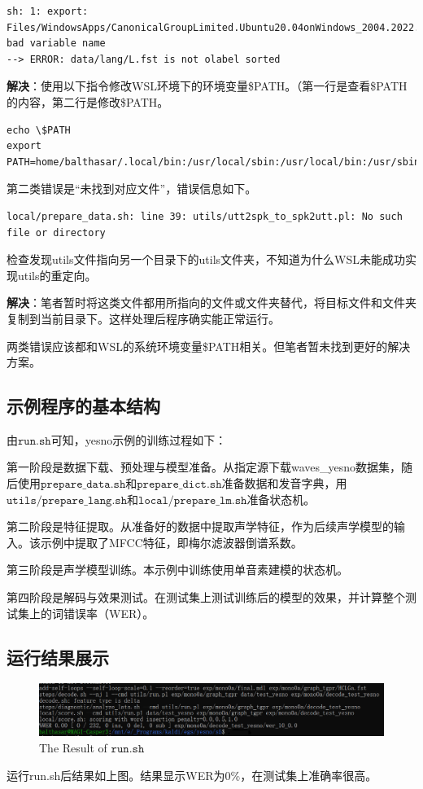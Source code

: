 \documentclass[a4paper]{article}
\begin{document}
\begin{lstlisting}
sh: 1: export: Files/WindowsApps/CanonicalGroupLimited.Ubuntu20.04onWindows_2004.2022.8.0_x64__79rhkp1fndgsc:/mnt/e/Program: bad variable name
--> ERROR: data/lang/L.fst is not olabel sorted
\end{lstlisting}

\textbf{解决}：使用以下指令修改WSL环境下的环境变量\$PATH。（第一行是查看\$PATH的内容，第二行是修改\$PATH。

\begin{lstlisting}
echo \$PATH 
export PATH=home/balthasar/.local/bin:/usr/local/sbin:/usr/local/bin:/usr/sbin:/usr/bin:/sbin:/bin:/usr/games:/usr/local/games:/usr/lib/wsl/
\end{lstlisting}

第二类错误是“未找到对应文件”，错误信息如下。

\begin{lstlisting}
local/prepare_data.sh: line 39: utils/utt2spk_to_spk2utt.pl: No such file or directory
\end{lstlisting}

检查发现utils文件指向另一个目录下的utils文件夹，不知道为什么WSL未能成功实现utils的重定向。

\textbf{解决}：笔者暂时将这类文件都用所指向的文件或文件夹替代，将目标文件和文件夹复制到当前目录下。这样处理后程序确实能正常运行。

两类错误应该都和WSL的系统环境变量\$PATH相关。但笔者暂未找到更好的解决方案。

\subsection{示例程序的基本结构}
由$\mathtt{run.sh}$可知，yesno示例的训练过程如下：

第一阶段是数据下载、预处理与模型准备。从指定源下载waves\_yesno数据集，随后使用$\mathtt{prepare\_data.sh}$和$\mathtt{prepare\_dict.sh}$准备数据和发音字典，用$\mathtt{utils/prepare\_lang.sh}$和$\mathtt{local/prepare\_lm.sh}$准备状态机。

第二阶段是特征提取。从准备好的数据中提取声学特征，作为后续声学模型的输入。该示例中提取了MFCC特征，即梅尔滤波器倒谱系数。

第三阶段是声学模型训练。本示例中训练使用单音素建模的状态机。

第四阶段是解码与效果测试。在测试集上测试训练后的模型的效果，并计算整个测试集上的词错误率（WER）。

\subsection{运行结果展示}

\begin{figure}[htb]
  \includegraphics[scale=0.39]{run.png}
  \caption{The Result of $\mathtt{run.sh}$}
  \label{fig1}
\end{figure}

运行run.sh后结果如上图。结果显示WER为0\%，在测试集上准确率很高。
\end{document}
